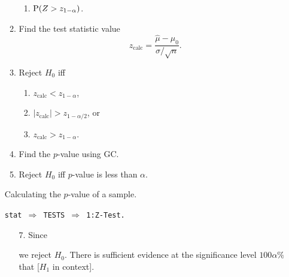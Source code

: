 \documentclass[../Notes.tex]{subfiles}
\begin{document}
\begin{stbox}{}
\begin{itemize}
\begin{minipage}[t]{0.45\textwidth}
\begin{enumerate}
\begin{enumerate}
            \item \(\operatorname{P}(Z>z_{1-\alpha})\).
          \end{enumerate}
          \item Find the test statistic value 
          \[z_\text{calc}=\frac{\hat{\mu}-\mu_0}{\sigma/\sqrt{n}}.\]
          \item Reject \(H_0\) iff 
          \begin{enumerate}
            \item \(z_\text{calc}<z_{1-\alpha}\),
            \item \(\lvert z_\text{calc} \rvert>z_{1-\alpha/2}\), or
            \item \(z_\text{calc}>z_{1-\alpha}\).
          \end{enumerate}
        \end{enumerate}
      \end{minipage}
      \begin{minipage}[t]{0.45\textwidth}
        \begin{enumerate}
          \setcounter{enumi}{3}
          \item Find the \(p\)-value using GC.
          \item Reject \(H_0\) iff \(p\)-value is less than \(\alpha\).
        \end{enumerate}
        \vfill
        \begin{flushright}
          \begin{minipage}{0.8\textwidth}
            \begin{GCSkills}{}
              Calculating the \(p\)-value of a sample.
              \begin{center}
                \texttt{stat \(\Longrightarrow\) TESTS \(\Longrightarrow\) 1:Z-Test.}
              \end{center}
            \end{GCSkills}
          \end{minipage}
        \end{flushright}
      \end{minipage}
      \begin{enumerate}
        \item[7.] Since\quad
        we reject \(H_0\). There is sufficient evidence at the significance level \(100\alpha\%\) that [\(H_1\) in context].


\end{enumerate}
\end{itemize}
\end{stbox}
\end{document}
